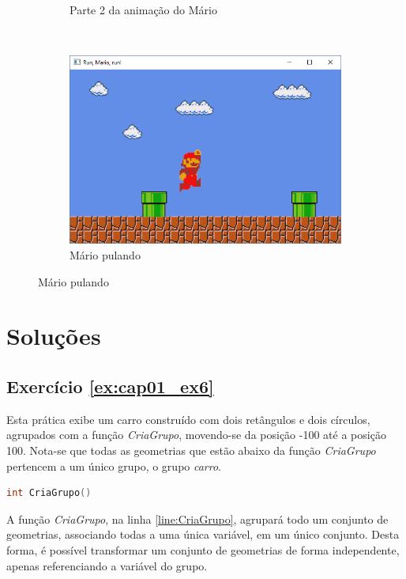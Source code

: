 \begin{enumerate}
\begin{figure}[!htp]
\begin{subfigure}[b]{0.3\textwidth}
        \caption{Parte 2 da animação do Mário}
        \label{fig:cap01_ex6c}
    \end{subfigure}
    ~
    \begin{subfigure}[b]{0.3\textwidth}
        \centerline{\includegraphics[width=.9\textwidth]{img/cap1_ex25d}}
        \caption{Mário pulando}
        \label{fig:cap01_ex6c}
    \end{subfigure}

  \end{figure}

\end{enumerate}

\section*{Soluções}

\subsection*{Exercício \ref{ex:cap01_ex6}}

Esta prática exibe um carro construído com dois retângulos e dois círculos, agrupados com a função \emph{CriaGrupo}, movendo-se da posição -100 até a posição 100. Nota-se que todas as geometrias que estão abaixo da função \emph{CriaGrupo} pertencem a um único grupo, o grupo \emph{carro}.


\begin{lstlisting}[label={func:CriaGrupo},language=C++]
int CriaGrupo()
\end{lstlisting}
A função \emph{CriaGrupo}, na linha \ref{line:CriaGrupo}, agrupará todo um conjunto de geometrias, associando todas a uma única variável, em um único conjunto. Desta forma, é possível transformar um conjunto de geometrias de forma independente, apenas referenciando a variável do grupo.

